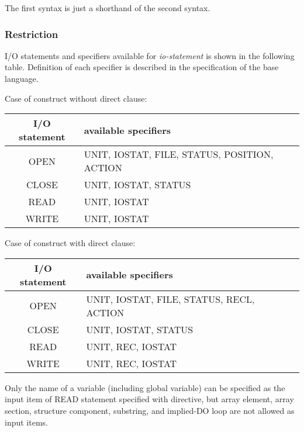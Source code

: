    The first syntax is just a shorthand of the second syntax.

   \subsubsection*{Restriction}

   I/O statements and specifiers available for {\it io-statement} is
   shown in the following table.
   Definition of each specifier is described in the specification of the base language. 

   Case of \gio construct without direct clause:
   \begin{table}[h]
   \begin{center}
    \label{tb:globalstatement}
    \begin{tabular}{|c||l|}
      \hline
     I/O statement & available specifiers \\ \hline \hline
     OPEN & UNIT, IOSTAT, FILE, STATUS, POSITION, ACTION \\ \hline
     CLOSE & UNIT, IOSTAT, STATUS \\ \hline
     READ & UNIT, IOSTAT \\ \hline
     WRITE & UNIT, IOSTAT \\ \hline
    \end{tabular}
   \end{center}
   \end{table}

   Case of \gio construct with direct clause:
   \begin{table}[h]
   \begin{center}
    \label{tb:globalstatement}
    \begin{tabular}{|c||l|}
      \hline
     I/O statement & available specifiers \\ \hline \hline
     OPEN & UNIT, IOSTAT, FILE, STATUS, RECL, ACTION \\ \hline
     CLOSE & UNIT, IOSTAT, STATUS \\ \hline
     READ & UNIT, REC, IOSTAT \\ \hline
     WRITE & UNIT, REC, IOSTAT \\ \hline
    \end{tabular}
   \end{center}
   \end{table}

   Only the name of a variable (including global variable) can be specified 
   as the input item of READ statement specified with \gio directive,
   but array element, array section,
   structure component, substring, and implied-DO loop are not allowed as input items.

